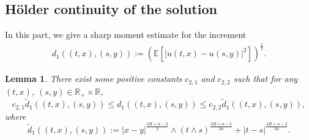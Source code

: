 \documentclass[11pt,reqno]{amsart}
\numberwithin{equation}{section}
\newtheorem{lemma}{Lemma}[section]
\def\RR{\mathbb{R}}
\def\EE{\mathbb{E}}
\newcommand{\1}{{\bf 1}}
\newcommand{\2}{{\bf 2}}
\begin{document}
\subsection{H\"{o}lder continuity of  the solution}
In this part,  we give a sharp moment estimate for the increment
\begin{align}\label{eq d1}
d_1 ((t,x), (s,y)):=\left(\EE\left[| u(t,x)-  u(s,y)|^2\right]\right)^{\frac12}.
\end{align}
\begin{lemma}\label{metric} There exist some  positive constants $c_{2,1}$ and $c_{2, 2}$ such that for any  $(t,x)$, $(s,y)\in \RR_+\times\RR$,
\begin{equation}\label{equ-metric-d1}
c_{2,1}\tilde d_{1}((t,x),(s,y))\le  d_1 ((t,x), (s,y)) \le c_{2,2}\tilde d_{1}((t,x),(s,y)),
\end{equation}
  where
\begin{equation*}
\tilde d_{1}((t,x),(s,y))
:= |x-y|^{\frac{2H+\alpha-2}{2}}\wedge(t\wedge s)^{\frac{2H+\alpha-2}{2\alpha}}+|t-s|^{\frac{2H+\alpha-2}{2\alpha}}.
\end{equation*}
\end{lemma}
\end{document}
